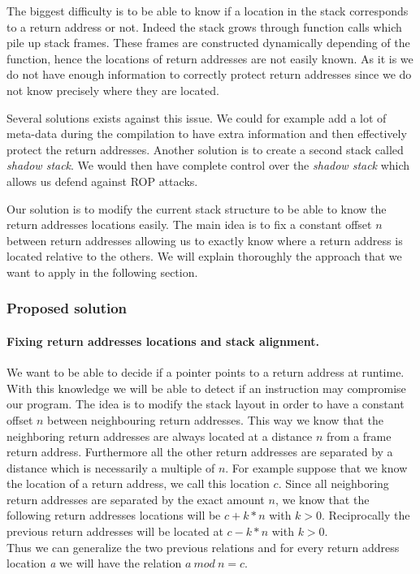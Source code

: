 \documentclass[11pt]{sdm}
\begin{document}
The biggest difficulty is to be able to know if a location in the stack corresponds to a return address or not. Indeed the stack grows through function calls which pile up stack frames. 
These frames are constructed dynamically depending of the function, hence the locations of return addresses are not easily known.
As it is we do not have enough information to correctly protect return addresses since we do not know precisely where they are located.

Several solutions exists against this issue. We could for example add a lot of meta-data during the compilation to have extra information and then effectively protect the return addresses. Another solution is to create a second stack called \textit{shadow stack}. We would then have complete control over the \textit{shadow stack} which allows us defend against ROP attacks.

Our solution is to modify the current stack structure to be able to know the return addresses locations easily. The main idea is to fix a constant offset $n$ between return addresses allowing us to exactly know where a return address is located relative to the others. We will explain thoroughly the approach that we want to apply in the following section.

\subsubsection{Proposed solution}

\paragraph{Fixing return addresses locations and stack alignment.}
\label{par:Fixing return addresses locations}

We want to be able to decide if a pointer points to a return address at runtime. With this knowledge we will be able to detect if an instruction may compromise our program.
The idea is to modify the stack layout in order to have a constant offset $n$ between neighbouring return addresses. This way we know that the neighboring return addresses are always located at a distance $n$ from a frame return address. Furthermore all the other return addresses are separated by a distance which is necessarily a multiple of $n$.
For example suppose that we know the location of a return address, we call this location $c$.
Since all neighboring return addresses are separated by the exact amount $n$, we know that the following return addresses locations will be $c+k*n$ with $k>0$. Reciprocally the previous return addresses will be located at $c-k*n$ with $k>0$.\\
Thus we can generalize the two previous relations and for every return address location \textit{a} we will have the relation $a~mod~n = c$.
\end{document}
